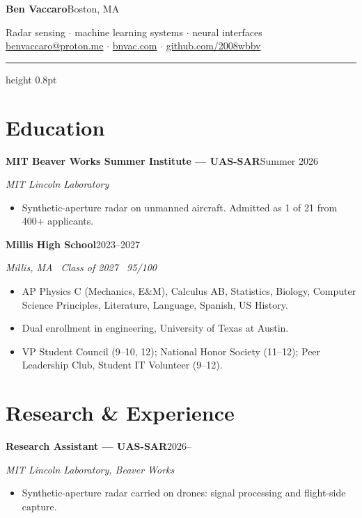 \documentclass[10pt,letterpaper]{article}
\newcommand{\entry}[2]{%
  \vspace{2pt}%
  \noindent\textbf{#1}\hfill{\footnotesize #2}\par
}
\newcommand{\where}[1]{{\footnotesize\itshape #1}\par\vspace{1pt}}
\begin{document}
{\LARGE\bfseries Ben Vaccaro}\hfill{\footnotesize Boston, MA}

\vspace{2pt}
{\footnotesize
Radar sensing $\cdot$ machine learning systems $\cdot$ neural interfaces
\hfill
\href{mailto:benvaccaro@proton.me}{benvaccaro@proton.me} $\cdot$
\href{https://bnvac.com}{bnvac.com} $\cdot$
\href{https://github.com/2008wbbv}{github.com/2008wbbv}
}

\vspace{4pt}\hrule height 0.8pt

\section{Education}

\entry{MIT Beaver Works Summer Institute --- UAS-SAR}{Summer 2026}
\where{MIT Lincoln Laboratory}
\begin{itemize}
  \item Synthetic-aperture radar on unmanned aircraft. Admitted as 1 of 21 from 400+ applicants.
\end{itemize}

\entry{Millis High School}{2023--2027}
\where{Millis, MA \textperiodcentered\ Class of 2027 \textperiodcentered\ 95/100}
\begin{itemize}
  \item AP Physics C (Mechanics, E\&M), Calculus AB, Statistics, Biology,
        Computer Science Principles, Literature, Language, Spanish, US History.
  \item Dual enrollment in engineering, University of Texas at Austin.
  \item VP Student Council (9--10, 12); National Honor Society (11--12);
        Peer Leadership Club, Student IT Volunteer (9--12).
\end{itemize}

\section{Research \& Experience}

\entry{Research Assistant --- UAS-SAR}{2026--}
\where{MIT Lincoln Laboratory, Beaver Works}
\begin{itemize}
  \item Synthetic-aperture radar carried on drones: signal processing and flight-side capture.
\end{itemize}
\end{document}
